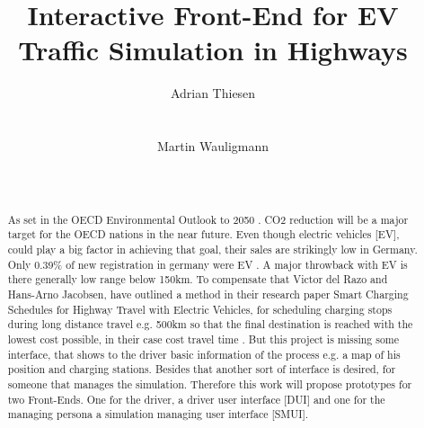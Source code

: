 \documentclass[hidelinks]{sig-alternate}
\begin{document}
\title{Interactive Front-End for EV Traffic Simulation in Highways}



\author{
\alignauthor Adrian Thiesen\\
       \\
       \\
\alignauthor Martin Wauligmann\\
       \\
       \\
}


\maketitle


\begin{abstract}

As set in the OECD Environmental Outlook to 2050  \cite{1}. \href{https://www.oecd.org/env/cc/49082173.pdf}{} CO2 reduction
will be a major target for the OECD nations in the near future. Even though electric vehicles [EV], could play a big
factor in achieving that goal, their sales are strikingly low in Germany. Only 0.39\% of new registration in germany
were EV \cite{2}.\href{http://www.kba.de/DE/Statistik/Fahrzeuge/Neuzulassungen/neuzulassungen_node.html}{} A major
throwback with EV is there generally low range below 150km. To compensate that Victor del Razo and Hans-Arno
Jacobsen, have outlined a method in their research paper Smart Charging Schedules for Highway Travel with Electric
Vehicles, for scheduling charging stops during long distance travel e.g. 500km  so that the final destination is
reached with the lowest cost possible, in their case cost travel time \cite{3}\href{https://www.i13.in.tum
.de/fileadmin/w00bof/www/PDF/TTE_2016.pdf}{}. But this project is missing some interface, that shows to the driver
basic information of the process e.g. a map of his position and charging stations. Besides that another sort of
interface is desired, for someone that manages the simulation. Therefore this work will propose prototypes
for two Front-Ends. One for the driver, a driver user interface [DUI] and one for the managing persona a simulation
managing user interface [SMUI].

\end{abstract}
\end{document}
